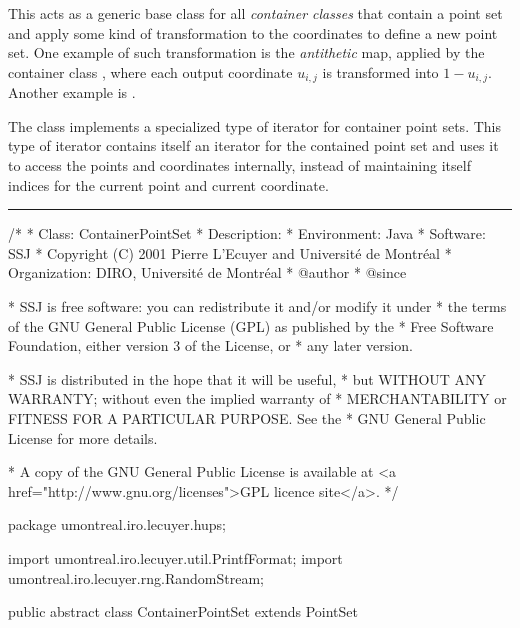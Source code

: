 
This acts as a generic base class for all \emph{container
classes} that contain a point set and apply some kind of
transformation to the coordinates to define a new point set.
One example of such transformation is the \emph{antithetic} map,
applied by the container class ,
where each output coordinate $u_{i,j}$ is transformed into $1-u_{i,j}$.
Another example is .

The class implements a specialized type of iterator for container
point sets.  This type of iterator contains itself an iterator for
the contained point set and uses it to access the points and coordinates
internally, instead of maintaining itself indices for the current point
and current coordinate.


\bigskip\hrule\bigskip

\begin{code}
\begin{hide}
/*
 * Class:        ContainerPointSet
 * Description:  
 * Environment:  Java
 * Software:     SSJ 
 * Copyright (C) 2001  Pierre L'Ecuyer and Université de Montréal
 * Organization: DIRO, Université de Montréal
 * @author       
 * @since

 * SSJ is free software: you can redistribute it and/or modify it under
 * the terms of the GNU General Public License (GPL) as published by the
 * Free Software Foundation, either version 3 of the License, or
 * any later version.

 * SSJ is distributed in the hope that it will be useful,
 * but WITHOUT ANY WARRANTY; without even the implied warranty of
 * MERCHANTABILITY or FITNESS FOR A PARTICULAR PURPOSE.  See the
 * GNU General Public License for more details.

 * A copy of the GNU General Public License is available at
   <a href="http://www.gnu.org/licenses">GPL licence site</a>.
 */
\end{hide}
package umontreal.iro.lecuyer.hups;\begin{hide}

import umontreal.iro.lecuyer.util.PrintfFormat;
import umontreal.iro.lecuyer.rng.RandomStream;
\end{hide}

public abstract class ContainerPointSet extends PointSet \begin{hide} {
   protected PointSet P;                 // contained point set
\end{hide}
\end{code}

